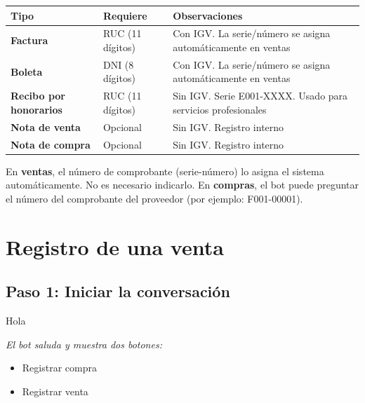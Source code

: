 \documentclass[12pt,a4paper]{article}
\begin{document}
\begin{center}
\begin{tabular}{>{\bfseries}l p{4.5cm} p{4.5cm}}
\toprule
Tipo & Requiere & Observaciones \\
\midrule
Factura & RUC (11 d\'igitos) & Con IGV. La serie/n\'umero se asigna autom\'aticamente en ventas \\
Boleta & DNI (8 d\'igitos) & Con IGV. La serie/n\'umero se asigna autom\'aticamente en ventas \\
Recibo por honorarios & RUC (11 d\'igitos) & Sin IGV. Serie E001-XXXX. Usado para servicios profesionales \\
Nota de venta & Opcional & Sin IGV. Registro interno \\
Nota de compra & Opcional & Sin IGV. Registro interno \\
\bottomrule
\end{tabular}
\end{center}

\begin{notaimportante}
En \textbf{ventas}, el n\'umero de comprobante (serie-n\'umero) lo asigna el sistema autom\'aticamente. No es necesario indicarlo. En \textbf{compras}, el bot puede preguntar el n\'umero del comprobante del proveedor (por ejemplo: F001-00001).
\end{notaimportante}

\section{Registro de una venta}

\subsection{Paso 1: Iniciar la conversaci\'on}

\begin{mensajeusuario}
Hola
\end{mensajeusuario}

\begin{mensajebot}
\textit{El bot saluda y muestra dos botones:}
\begin{itemize}[label=\textbullet]
    \item Registrar compra
    \item Registrar venta
\end{itemize}
\end{mensajebot}
\end{document}
